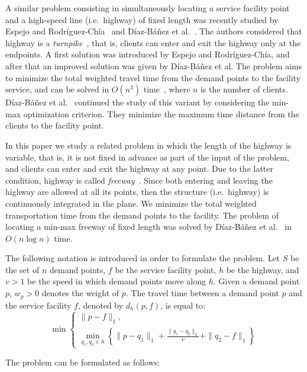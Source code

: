 \documentclass[11pt,a4paper,oneside,onecolumn]{article}
\begin{document}
A similar problem consisting in simultaneously locating a
service facility point and a high-speed line (i.e.\ highway) 
of fixed length was recently studied by
Espejo and Rodr\'{i}guez-Ch\'{i}a~\cite{espejo11} and D\'iaz-B\'a\~nez et
al.~\cite{diaz-banez11}. The authors considered that highway is a 
\emph{turnpike}~\cite{korman08}, that is, clients can enter
and exit the highway only at the endpoints. 
A first solution was introduced by Espejo and Rodr\'{i}guez-Ch\'ia, and
after that an improved solution was given by D\'iaz-B\'a\~nez et al. 
The problem aims to minimize
the total weighted travel time from the demand points to the facility
service, and can be solved in $O(n^3)$ time~\cite{diaz-banez11}, where 
$n$ is the number of clients.
D\'iaz-B\'a\~nez et al.~\cite{diaz-banez11-3}
continued the study of this variant by considering the min-max
optimization criterion. They minimize the maximum time distance from
the clients to the facility point.

In this paper we study a related problem in which the length of the
highway is variable, that is, it is not fixed in advance as part
of the input of the problem, and clients can enter and
exit the highway at any point. Due to the latter condition, highway is called
\emph{freeway}~\cite{korman08}. Since both entering and leaving the highway are
allowed at all its points, then the structure (i.e.\ highway) is continuously
integrated in the plane.
We minimize the total weighted
transportation time from the demand points to the facility. The problem
of locating a min-max freeway of fixed length was solved by
D\'iaz-B\'a\~nez et al.~\cite{diaz-banez11-3} in $O(n\log n)$ time.

The following notation is introduced in order to formulate the problem.
Let $S$ be the set of $n$ demand points, $f$ be the service facility
point, $h$ be the highway, and $v>1$ be the speed in which demand
points move along $h$. Given a demand point $p$, $w_p>0$ denotes the
weight of $p$. The travel time between a demand point $p$ and the
service facility $f$, denoted by $d_h(p,f)$, is equal to:
\begin{equation}\label{eq1}
\min\left\{
\begin{array}{l}
\|p-f\|_1,\\
\min_{q_1,q_2\in
h}\left\{\|p-q_1\|_1+\frac{\|q_1-q_2\|_2}{v}+\|q_2-f\|_1\right\}
\end{array}
\right.
\end{equation}

The problem can be formulated as follows:
\end{document}
